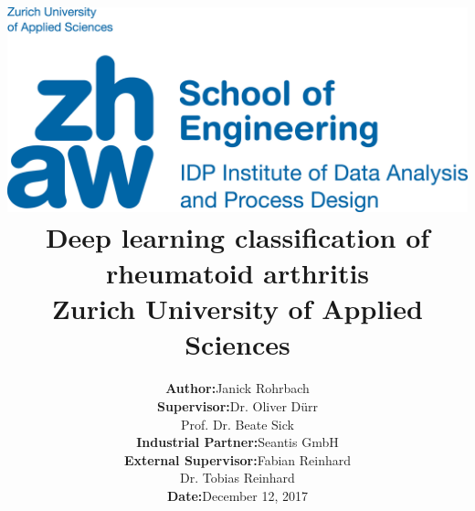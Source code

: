 \documentclass[12pt]{article}
\begin{document}
\title{
\vspace{-2.0cm}
\includegraphics{zhaw}\\ 
\vspace{3cm}
Deep learning classification of rheumatoid arthritis\\
{\Large Zurich University of Applied Sciences}}
\author{\begin{tabular}{rl}
  \textbf{Author:} & Janick Rohrbach \\
  \textbf{Supervisor:} & Dr. Oliver Dürr \\ & Prof. Dr. Beate Sick \\
  \textbf{Industrial Partner:} & Seantis GmbH \\
  \textbf{External Supervisor:} & Fabian Reinhard \\ & Dr. Tobias Reinhard \\
  \textbf{Date:} & December 12, 2017 \\
  \hspace{6.0cm} & \hspace{6.0cm}
\end{tabular}}
\date{}
\maketitle

\newpage
\end{document}
